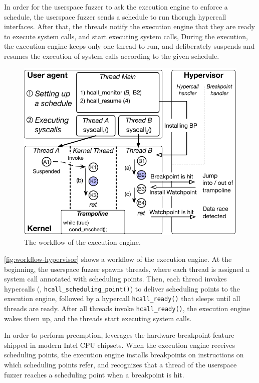 %
In order for the userspace fuzzer to ask the execution engine to
enforce a schedule, the userspace fuzzer sends a schedule to run
thorugh hypercall interfaces.
%
After that, the threads notify the execution engine that they are
ready to execute system calls, and start executing system calls,
%
During the execution, the execution engine keeps only one thread to
run, and deliberately suspends and resumes the execution of system
calls according to the given schedule.

%
\begin{figure}[t]
  \centering
  \includegraphics[width=0.9\linewidth]{fig/workflow-hypervisor.pdf}
  \caption{The workflow of the execution engine. }
  \label{fig:workflow-hypervisor}
\end{figure}
%
\autoref{fig:workflow-hypervisor} shows a workflow of the execution
engine.
%
At the beginning, the userspace fuzzer spawns threads, where each
thread is assigned a system call annotated with scheduling points.
%
Then, each thread invokes hypercalls (\ie,
\texttt{hcall_scheduling_point()}) to deliver scheduling points to the
execution engine, followed by a hypercall \texttt{hcall_ready()} that
sleeps until all threads are ready.
%
After all threads invoke \texttt{hcall_ready()}, the execution engine
wakes them up, and the threads start executing system calls.


\dr{}



%
In order to perform preemption, \sys leverages the hardware breakpoint
feature~\cite{hwbp} shipped in modern Intel CPU chipsets.
%
When the execution engine receives scheduling points, the execution
engine installs breakpoints on instructions on which scheduling points
refer, and recognizes that a thread of the userspace fuzzer reaches a
scheduling point when a breakpoint is hit.


